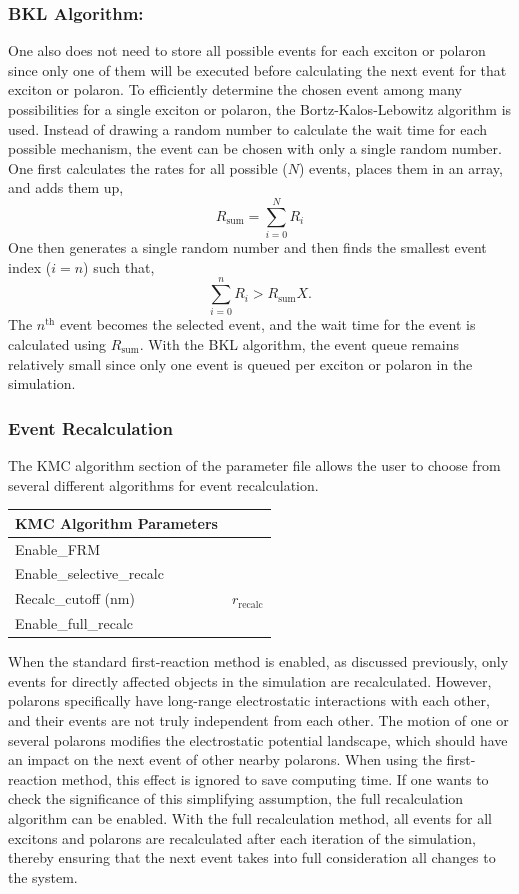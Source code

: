 \documentclass[%
 reprint,onecolumn,notitlepage,
superscriptaddress,longbibliography,
 amsmath,amssymb,
 aps,rmp,floatfix,
]{revtex4-1}
\begin{document}
\subsubsection{BKL Algorithm:}

One also does not need to store all possible events for each exciton or polaron since only one of them will be executed before calculating the next event for that exciton or polaron. 
To efficiently determine the chosen event among many possibilities for a single exciton or polaron, the Bortz-Kalos-Lebowitz algorithm is used.\cite{bortz1974prb}
Instead of drawing a random number to calculate the wait time for each possible mechanism, the event can be chosen with only a single random number. 
One first calculates the rates for all possible ($N$) events, places them in an array, and adds them up,
$$R_\text{sum} = \sum_{i=0}^N R_i$$
One then generates a single random number and then finds the smallest event index ($i=n$) such that,
$$\sum_{i=0}^n R_i > R_\text{sum}X.$$
The $n^\text{th}$ event becomes the selected event, and the wait time for the event is calculated using $R_\text{sum}$. 
With the BKL algorithm, the event queue remains relatively small since only one event is queued per exciton or polaron in the simulation.

\subsubsection{Event Recalculation}

The KMC algorithm section of the parameter file allows the user to choose from several different algorithms for event recalculation.

\begin{center}
\begin{tabular}{ l l }
\hline
KMC Algorithm Parameters & \\
\hline
Enable\_FRM & \\
Enable\_selective\_recalc & \\
Recalc\_cutoff (nm) & $r_{\text{recalc}}$ \\
Enable\_full\_recalc & \\
\hline
\end{tabular}
\end{center}

When the standard first-reaction method is enabled, as discussed previously, only events for directly affected objects in the simulation are recalculated.
However, polarons specifically have long-range electrostatic interactions with each other, and their events are not truly independent from each other.
The motion of one or several polarons modifies the electrostatic potential landscape, which should have an impact on the next event of other nearby polarons. 
When using the first-reaction method, this effect is ignored to save computing time. 
If one wants to check the significance of this simplifying assumption, the full recalculation algorithm can be enabled. 
With the full recalculation method, all events for all excitons and polarons are recalculated after each iteration of the simulation, thereby ensuring that the next event takes into full consideration all changes to the system.
\end{document}

